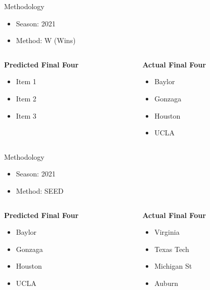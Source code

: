 \documentclass{beamer}
\begin{document}
\begin{frame}{Methodology}
\begin{itemize}
  \item Season: 2021
  \item Method: W (Wins)
\end{itemize}

\begin{columns}[T] %
\begin{column}{0.5\textwidth} %
  \textbf{Predicted Final Four}
  \begin{itemize}
    \item Item 1
    \item Item 2
    \item Item 3
  \end{itemize}
\end{column}
\begin{column}{0.5\textwidth} %
  \textbf{Actual Final Four}
  \begin{itemize}
    \item Baylor
    \item Gonzaga
    \item Houston
    \item UCLA
  \end{itemize}
\end{column}
\end{columns}
\end{frame}

\begin{frame}{Methodology}
\begin{itemize}
  \item Season: 2021
  \item Method: SEED
\end{itemize}

\begin{columns}[T] %
\begin{column}{0.5\textwidth} %
  \textbf{Predicted Final Four}
  \begin{itemize}
    \item Baylor
    \item Gonzaga
    \item Houston
    \item UCLA
  \end{itemize}
\end{column}
\begin{column}{0.5\textwidth} %
  \textbf{Actual Final Four}
  \begin{itemize}
    \item Virginia
    \item Texas Tech
    \item Michigan St
    \item Auburn
  \end{itemize}
\end{column}
\end{columns}
\end{frame}
\end{document}
